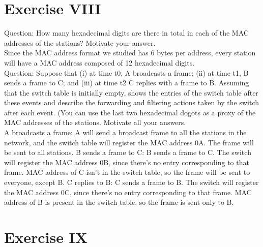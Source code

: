 \documentclass[11pt]{article}
\begin{document}
	\section*{Exercise VIII}
	Question:
	How many hexadecimal digits are there in total in each of the MAC addresses of the stations? Motivate your answer.\\
	Since the MAC address format we studied has 6 bytes per address, every station will have a MAC address composed of 12 hexadecimal digits.\\
	Question:
	Suppose that (i) at time t0, A broadcasts a frame; (ii) at time t1, B sends a frame to C; and (iii) at time t2 C replies with a frame to B. Assuming that the switch table is initially empty, shows the entries of the switch table after these events and describe the forwarding and filtering actions taken by the switch after each event. (You can use the last two hexadecimal dogots as a proxy of the MAC addresses of the stations. Motivate all your answers.\\
	A broadcasts a frame: A will send a broadcast frame to all the stations in the network, and the switch table will register the MAC address 0A. The frame will be sent to all stations.
	B sends a frame to C: B sends a frame to C. The switch will register the MAC address 0B, since there's no entry corresponding to that frame. MAC address of C isn't in the switch table, so the frame will be sent to everyone, except B.
	C replies to B: C sends a frame to B. The switch will register the MAC address 0C, since there's no entry corresponding to that frame. MAC address of B is present in the switch table, so the frame is sent only to B.
	\section*{Exercise IX}
\end{document}
